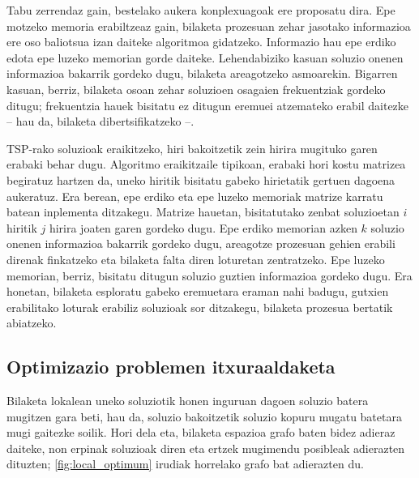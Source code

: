 \documentclass[eu]{ifirak}\usepackage[]{graphicx}\usepackage[]{color}
\newcommand{\zkk}{\guillemotleft}
\newcommand{\skk}{\guillemotright}
\begin{document}
Tabu zerrendaz gain, bestelako aukera konplexuagoak ere proposatu dira. Epe motzeko memoria erabiltzeaz gain, bilaketa prozesuan zehar jasotako informazioa ere oso baliotsua izan daiteke algoritmoa gidatzeko. Informazio hau epe erdiko edota epe luzeko memorian gorde daiteke. Lehendabiziko kasuan soluzio onenen informazioa bakarrik gordeko dugu, bilaketa areagotzeko asmoarekin. Bigarren kasuan, berriz, bilaketa osoan zehar soluzioen osagaien frekuentziak gordeko ditugu; frekuentzia hauek bisitatu ez ditugun eremuei atzemateko erabil daitezke -- hau da, bilaketa dibertsifikatzeko --.


\begin{tcolorbox}
\begin{ifexample}
TSP-rako soluzioak eraikitzeko, hiri bakoitzetik zein hirira mugituko garen erabaki behar dugu. Algoritmo eraikitzaile tipikoan, erabaki hori kostu matrizea begiratuz hartzen da, uneko hiritik bisitatu gabeko hirietatik gertuen dagoena aukeratuz. Era berean, epe erdiko eta epe luzeko memoriak matrize karratu batean inplementa ditzakegu. Matrize hauetan, bisitatutako zenbat soluzioetan $i$ hiritik $j$ hirira joaten garen gordeko dugu. Epe erdiko memorian azken $k$ soluzio onenen informazioa bakarrik gordeko dugu, areagotze prozesuan gehien erabili direnak finkatzeko eta bilaketa falta diren loturetan zentratzeko. Epe luzeko memorian, berriz, bisitatu ditugun soluzio guztien informazioa gordeko dugu. Era honetan, bilaketa esploratu gabeko eremuetara eraman nahi badugu, gutxien erabilitako loturak erabiliz soluzioak sor ditzakegu, bilaketa prozesua bertatik abiatzeko.
\end{ifexample}
\end{tcolorbox}


\subsection{Optimizazio problemen \zkk itxura\skk aldaketa}

Bilaketa lokalean uneko soluziotik honen inguruan dagoen soluzio batera mugitzen gara beti, hau da, soluzio bakoitzetik soluzio kopuru mugatu batetara mugi gaitezke soilik. Hori dela eta, bilaketa espazioa grafo baten bidez adieraz daiteke, non erpinak soluzioak diren eta ertzek mugimendu posibleak adierazten dituzten; \ref{fig:local_optimum} irudiak horrelako grafo bat adierazten du.
\end{document}

